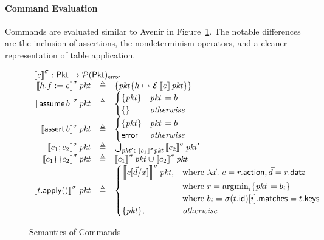 \documentclass{article}
\newcommand{\pkt}{\mathit{pkt}}
\newcommand{\error}{\mathsf{error}}
\newcommand{\denote}[1]{\left\llbracket#1\right\rrbracket}
\newcommand{\edenote}[1]{\mathcal{E}\denote{#1}}
\newcommand{\Pkt}{\mathsf{Pkt}}
\newcommand{\Row}{\mathsf{Row}}
\newcommand{\matches}{\mathsf{matches}}
\newcommand{\action}{\mathsf{action}}
\newcommand{\keys}{\mathsf{keys}}
\newcommand{\data}{\mathsf{data}}
\newcommand{\id}{\mathsf{id}}
\newcommand{\assert}{\mathop{\mathsf{assert}}}
\newcommand{\assume}{\mathop{\mathsf{assume}}}
\newcommand{\apply}{\mathsf{apply}}
\newcommand{\choiceop}{\rotatebox[origin=c]{90}{$\sqsubset\!\!\!\sqsupset$}}
\newcommand{\choice}{\mathbin{\choiceop}}
\newcommand{\havoc}[1]{\mathop{\textsf{havoc}}#1}
\newcommand{\argmin}{\mathop{\textrm{argmin}}}
\begin{document}
\paragraph{Command Evaluation}
Commands are evaluated similar to Avenir in Figure~\ref{fig:com-sem}. The
notable differences are the inclusion of assertions, the nondeterminism
operators, and a cleaner representation of table application.

\begin{figure}[htp]
  \[\begin{array}{r >{\triangleq}cl}
  \multicolumn{3}{l}{\denote{c}^\sigma : \Pkt \to \mathcal{P}(\Pkt)_\error }\\
    \denote{h.f := e}^\sigma\pkt && \{\pkt\{h \mapsto \edenote{e}\pkt\}\} \\
    \denote{\assume b}^\sigma\pkt &&
    \begin{cases}
      \{\pkt\} & \pkt \models b \\
      \{\} & \textit{otherwise} \\
    \end{cases}\\
    \denote{\assert b}^\sigma\pkt &&
    \begin{cases}
      \{\pkt\} & \pkt \models b \\
      \error & \textit{otherwise}
    \end{cases} \\
    \denote{c_1;c_2}^\sigma\pkt&&
    \bigcup_{\pkt' \in \denote{c_1}^\sigma\pkt}\denote{c_2}^\sigma\pkt' \\
    \denote{c_1 \choice c_2}^\sigma\pkt &&
    \denote{c_1}^\sigma\pkt \cup \denote{c_2}^\sigma\pkt \\
    \denote{t.\apply()}^\sigma\,\pkt &&
    \begin{cases}
      \denote{c[\vec d/\vec x]}^\sigma\pkt,
      & \text{where}~\lambda \vec x.~c = r.\action, \vec d = r.\data \\
      & \text{where}~r = \argmin_i\{\pkt \models b_i\} \\
      & \text{where}~b_i = \sigma(t.\id)[i].\matches = t.\keys \\
      \{\pkt\}, & \mathit{otherwise}
    \end{cases}
  \end{array}\]
  \caption{Semantics of Commands}
  \label{fig:com-sem}
\end{figure}
\end{document}

